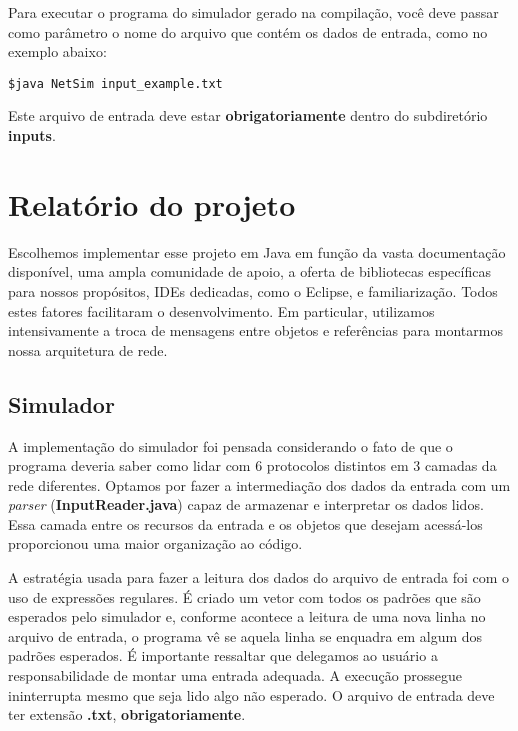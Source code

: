 \documentclass[11pt]{article}
\begin{document}
\noindent Para executar o programa do simulador gerado na compilação, você deve passar como parâmetro o nome do arquivo que contém os dados de entrada, como no exemplo abaixo: 

\color{cyan}
\begin{verbatim}
$java NetSim input_example.txt
\end{verbatim}
\color{black}

\noindent Este arquivo de entrada deve estar \textbf{\textcolor{warning}{obrigatoriamente}} dentro do subdiretório \textbf{inputs}. 

\section{Relatório do projeto}

Escolhemos implementar esse projeto em Java em função da vasta documentação disponível, uma ampla comunidade de apoio, a oferta de bibliotecas específicas para nossos propósitos, IDEs dedicadas, como o Eclipse, e familiarização. Todos estes fatores facilitaram o desenvolvimento. Em particular, utilizamos intensivamente a troca de mensagens entre objetos e referências para montarmos nossa arquitetura de rede.   

\subsection{Simulador}

A implementação do simulador foi pensada considerando o fato de que o programa deveria saber como lidar com 6 protocolos distintos em 3 camadas da rede diferentes. Optamos por fazer a intermediação dos dados da entrada com um \textit{parser} (\textbf{InputReader.java}) capaz de armazenar e interpretar os dados lidos. Essa camada entre os recursos da entrada e os objetos que desejam acessá-los proporcionou uma maior organização ao código.

A estratégia usada para fazer a leitura dos dados do arquivo de entrada foi com o uso de expressões regulares. É criado um vetor com todos os padrões que são esperados pelo simulador e, conforme acontece a leitura de uma nova linha no arquivo de entrada, o programa vê se aquela linha se enquadra em algum dos padrões esperados. É importante ressaltar que delegamos ao usuário a responsabilidade de montar uma entrada adequada. A execução prossegue ininterrupta mesmo que seja lido algo não esperado. O arquivo de entrada deve ter extensão \textbf{.txt}, \textbf{\textcolor{warning}{obrigatoriamente}}.
\end{document}
